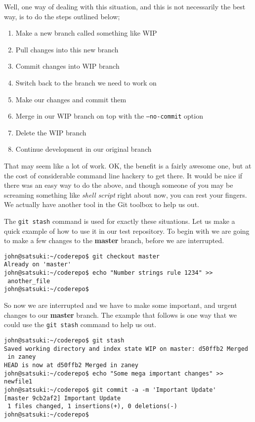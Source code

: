 Well, one way of dealing with this situation, and this is not necessarily the best way, is to do the steps outlined below;

\begin{enumerate}
\item Make a new branch called something like WIP
\item Pull changes into this new branch
\item Commit changes into WIP branch
\item Switch back to the branch we need to work on
\item Make our changes and commit them
\item Merge in our WIP branch on top with the \texttt{--no-commit} option
\item Delete the WIP branch
\item Continue development in our original branch
\end{enumerate}

That may seem like a lot of work.  OK, the benefit is a fairly awesome one, but at the cost of considerable command line hackery to get there.  It would be nice if there was an easy way to do the above, and though someone of you may be screaming something like \emph{shell script} right about now, you can rest your fingers.  We actually have another tool in the Git toolbox to help us out.

The \texttt{git stash} command is used for exactly these situations.  Let us make a quick example of how to use it in our test repository.  To begin with we are going to make a few changes to the \textbf{master} branch, before we are interrupted.

\begin{Verbatim}[frame=leftline,framerule=1mm,fontsize=\relsize{-3}] 
john@satsuki:~/coderepo$ git checkout master
Already on 'master'
john@satsuki:~/coderepo$ echo "Number strings rule 1234" >> 
 another_file
john@satsuki:~/coderepo$ 
\end{Verbatim}

So now we are interrupted and we have to make some important, and urgent changes to our \textbf{master} branch.  The example that follows is one way that we could use the \texttt{git stash} command to help us out.  

\begin{Verbatim}[frame=leftline,framerule=1mm,fontsize=\relsize{-3}] 
john@satsuki:~/coderepo$ git stash
Saved working directory and index state WIP on master: d50ffb2 Merged 
 in zaney
HEAD is now at d50ffb2 Merged in zaney
john@satsuki:~/coderepo$ echo "Some mega important changes" >> newfile1
john@satsuki:~/coderepo$ git commit -a -m 'Important Update'
[master 9cb2af2] Important Update
 1 files changed, 1 insertions(+), 0 deletions(-)
john@satsuki:~/coderepo$ 
\end{Verbatim}

